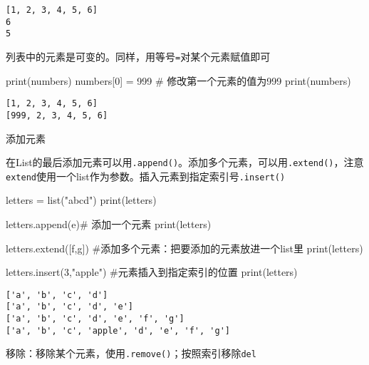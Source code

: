\documentclass[
  letterpaper,
  DIV=11,
  numbers=noendperiod]{scrreprt}
\newenvironment{Shaded}{\begin{snugshade}}{\end{snugshade}}
\newcommand{\BuiltInTok}[1]{\textcolor[rgb]{0.00,0.23,0.31}{#1}}
\newcommand{\CommentTok}[1]{\textcolor[rgb]{0.37,0.37,0.37}{#1}}
\newcommand{\DecValTok}[1]{\textcolor[rgb]{0.68,0.00,0.00}{#1}}
\newcommand{\NormalTok}[1]{\textcolor[rgb]{0.00,0.23,0.31}{#1}}
\newcommand{\OperatorTok}[1]{\textcolor[rgb]{0.37,0.37,0.37}{#1}}
\newcommand{\StringTok}[1]{\textcolor[rgb]{0.13,0.47,0.30}{#1}}
\begin{document}
\begin{verbatim}
[1, 2, 3, 4, 5, 6]
6
5
\end{verbatim}

列表中的元素是可变的。同样，用等号\texttt{=}对某个元素赋值即可

\begin{Shaded}
\begin{Highlighting}[]
\BuiltInTok{print}\NormalTok{(numbers)}
\NormalTok{numbers[}\DecValTok{0}\NormalTok{] }\OperatorTok{=} \DecValTok{999} \CommentTok{\# 修改第一个元素的值为999}
\BuiltInTok{print}\NormalTok{(numbers)}
\end{Highlighting}
\end{Shaded}

\begin{verbatim}
[1, 2, 3, 4, 5, 6]
[999, 2, 3, 4, 5, 6]
\end{verbatim}

添加元素

在List的最后添加元素可以用\texttt{.append()}。添加多个元素，可以用\texttt{.extend()}，注意\texttt{extend}使用一个list作为参数。插入元素到指定索引号\texttt{.insert()}

\begin{Shaded}
\begin{Highlighting}[]
\NormalTok{letters }\OperatorTok{=} \BuiltInTok{list}\NormalTok{(}\StringTok{"abcd"}\NormalTok{)}
\BuiltInTok{print}\NormalTok{(letters)}


\NormalTok{letters.append(}\StringTok{\textquotesingle{}e\textquotesingle{}}\NormalTok{)}\CommentTok{\# 添加一个元素}
\BuiltInTok{print}\NormalTok{(letters)}


\NormalTok{letters.extend([}\StringTok{\textquotesingle{}f\textquotesingle{}}\NormalTok{,}\StringTok{\textquotesingle{}g\textquotesingle{}}\NormalTok{]) }\CommentTok{\#添加多个元素：把要添加的元素放进一个list里}
\BuiltInTok{print}\NormalTok{(letters)}


\NormalTok{letters.insert(}\DecValTok{3}\NormalTok{,}\StringTok{"apple"}\NormalTok{) }\CommentTok{\#元素插入到指定索引的位置}
\BuiltInTok{print}\NormalTok{(letters)}
\end{Highlighting}
\end{Shaded}

\begin{verbatim}
['a', 'b', 'c', 'd']
['a', 'b', 'c', 'd', 'e']
['a', 'b', 'c', 'd', 'e', 'f', 'g']
['a', 'b', 'c', 'apple', 'd', 'e', 'f', 'g']
\end{verbatim}

移除：移除某个元素，使用\texttt{.remove()}；按照索引移除\texttt{del}
\end{document}
